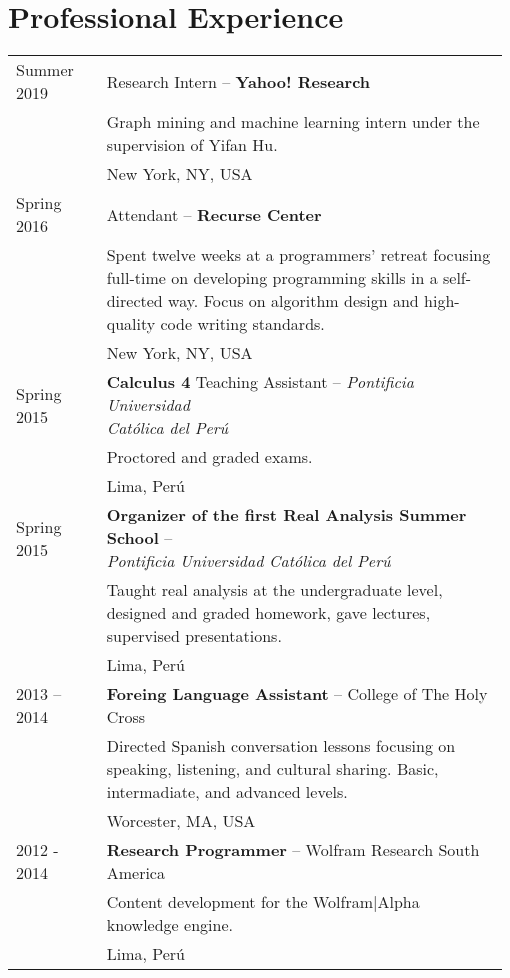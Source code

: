 \documentclass[12pt,]{scrartcl}
\begin{document}
\section{Professional Experience}\label{experience}
\begin{table}[h]
{\def\arraystretch{1.5}\tabcolsep=0pt
\begin{tabular}{p{0.18\linewidth}p{0.8\linewidth}}

Summer 2019 & Research Intern -- \textbf{Yahoo! Research} \\
& Graph mining and machine learning intern under the supervision of Yifan Hu. \\
& New York, NY, USA \\

Spring 2016 & Attendant -- \textbf{Recurse Center} \\
& Spent twelve weeks at a programmers' retreat focusing full-time on developing programming skills in a self-directed way. Focus on algorithm design and high-quality code writing standards. \\
& New York, NY, USA \\

Spring 2015 & \makecell[l]{\textbf{Calculus 4} Teaching Assistant -- \textit{Pontificia Universidad} \\ \textit{Católica del Perú}} \\
& Proctored and graded exams. \\
& Lima, Perú \\

Spring 2015 & \makecell[l]{\textbf{Organizer of the first Real Analysis Summer School} -- \\ \textit{Pontificia Universidad Católica del Perú}} \\
& Taught real analysis at the undergraduate level, designed and graded homework, gave lectures, supervised presentations. \\
& Lima, Perú \\

2013 -- 2014 & \textbf{Foreing Language Assistant} -- College of The Holy Cross \\ & Directed Spanish conversation lessons focusing on speaking, listening, and cultural sharing. Basic, intermadiate, and advanced levels. \\
& Worcester, MA, USA \\

2012 - 2014 & \textbf{Research Programmer} -- Wolfram Research South America \\
& Content development for the Wolfram|Alpha knowledge engine. \\
& Lima, Perú\\

\end{tabular}
}
\end{table}
\end{document}
